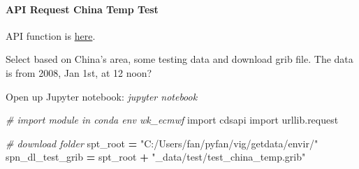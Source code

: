 \documentclass[
]{book}
\newenvironment{Shaded}{\begin{snugshade}}{\end{snugshade}}
\newcommand{\CommentTok}[1]{\textcolor[rgb]{0.56,0.35,0.01}{\textit{#1}}}
\newcommand{\ImportTok}[1]{#1}
\newcommand{\NormalTok}[1]{#1}
\newcommand{\OperatorTok}[1]{\textcolor[rgb]{0.81,0.36,0.00}{\textbf{#1}}}
\newcommand{\StringTok}[1]{\textcolor[rgb]{0.31,0.60,0.02}{#1}}
\begin{document}
\hypertarget{api-request-china-temp-test}{%
\paragraph{API Request China Temp Test}\label{api-request-china-temp-test}}

API function is \href{https://github.com/ecmwf/cdsapi/blob/master/cdsapi/api.py}{here}.

Select based on China's area, some testing data and download grib file. The data is from 2008, Jan 1st, at 12 noon?

Open up Jupyter notebook: \emph{jupyter notebook}

\begin{Shaded}
\begin{Highlighting}[]
\CommentTok{\# import module in conda env wk\_ecmwf}
\ImportTok{import}\NormalTok{ cdsapi}
\ImportTok{import}\NormalTok{ urllib.request}

\CommentTok{\# download folder}
\NormalTok{spt\_root }\OperatorTok{=} \StringTok{"C:/Users/fan/pyfan/vig/getdata/envir/"}
\NormalTok{spn\_dl\_test\_grib }\OperatorTok{=}\NormalTok{ spt\_root }\OperatorTok{+} \StringTok{"\_data/test/test\_china\_temp.grib"}


\end{Highlighting}
\end{Shaded}
\end{document}
